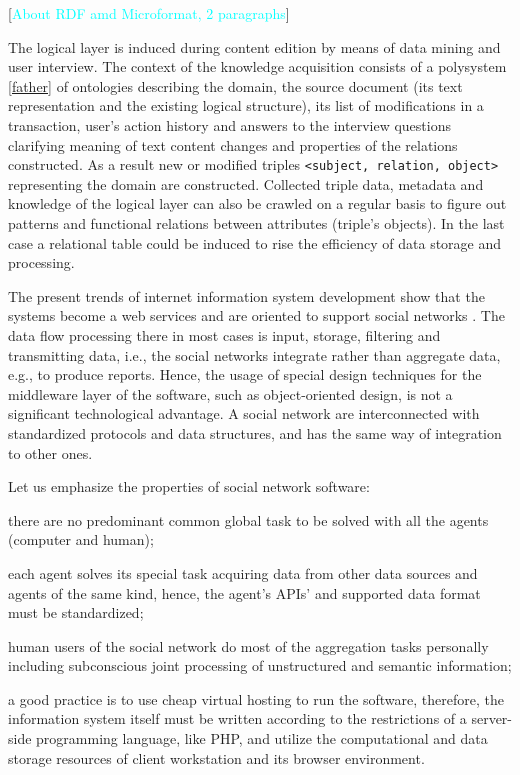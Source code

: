 \documentclass[conference]{IEEEtran}
\newcommand{\e}[2][fcolor]{\textcolor{pcolor}{[}\textcolor{#1}{#2}\textcolor{pcolor}{]}}
\begin{document}
\e[cyan]{About RDF amd Microformat, 2 paragraphs}

The logical layer is induced during content edition by means of data
mining and user interview.  The context of the knowledge acquisition
consists of a polysystem \ref{father} of ontologies describing the
domain, the source document (its text representation and the existing
logical structure), its list of modifications in a transaction, user's
action history and answers to the interview questions clarifying
meaning of text content changes and properties of the relations
constructed.  As a result new or modified triples \texttt{<subject,
  relation, object>} representing the domain are constructed.
Collected triple data, metadata and knowledge of the logical layer can
also be crawled on a regular basis to figure out patterns and
functional relations between attributes (triple's objects).  In the
last case a relational table could be induced to rise the efficiency
of data storage and processing.

The present trends of internet information system development show
that the systems become a web services and are oriented to support
social networks \cite{SN}.  The data flow processing there in most
cases is input, storage, filtering and transmitting data, i.e., the
social networks integrate rather than aggregate data, e.g., to produce
reports.  Hence, the usage of special design techniques for the
middleware layer of the software, such as object-oriented design, is
not a significant technological advantage.  A social network are
interconnected with standardized protocols and data structures, and
has the same way of integration to other ones.

Let us emphasize the properties of social network software:
\begin{IEEEitemize}[\IEEEsetlabelwidth{Z}]
\item there are no predominant common global task to be solved with
  all the agents (computer and human);
\item each agent solves its special task acquiring data from other
  data sources and agents of the same kind, hence, the agent's APIs’ and
  supported data format must be standardized;
\item human users of the social network do most of the aggregation
  tasks personally including subconscious joint processing of
  unstructured and semantic information;
\item a good practice is to use cheap virtual hosting to run the
  software, therefore, the information system itself must be written
  according to the restrictions of a server-side programming language,
  like PHP, and utilize the computational and data storage resources
  of client workstation and its browser environment.
\end{IEEEitemize}
\end{document}
